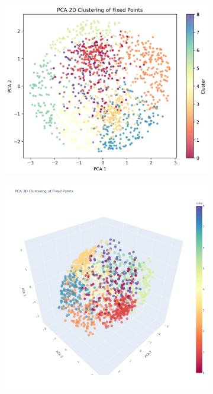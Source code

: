 \documentclass[a4paper,12pt]{article}
\begin{document}
\begin{figure}[H]
\centering
\begin{subfigure}{0.45\textwidth}
	\includegraphics[width=\textwidth,height=\textwidth]{PCA-2D}
	\caption{}
\end{subfigure}
\hfill
\begin{subfigure}{0.45\textwidth}
	\includegraphics[width=\textwidth,height=\textwidth]{PCA-3D}

\end{subfigure}
\end{figure}
\end{document}
